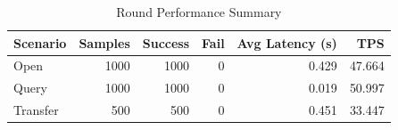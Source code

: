 \begin{table}
\caption{Round Performance Summary}
\label{tab:round_perf}
\begin{tabular}{lrrrrr}
\toprule
Scenario & Samples & Success & Fail & Avg Latency (s) & TPS \\
\midrule
Open & 1000 & 1000 & 0 & 0.429 & 47.664 \\
Query & 1000 & 1000 & 0 & 0.019 & 50.997 \\
Transfer & 500 & 500 & 0 & 0.451 & 33.447 \\
\bottomrule
\end{tabular}
\end{table}
